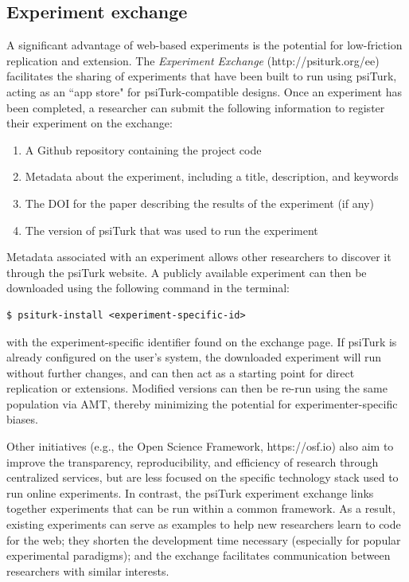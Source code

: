 \documentclass[twocolumn]{svjour3}          %
\begin{document}
\subsection{Experiment exchange}

A significant advantage of web-based experiments is the potential for low-friction replication and extension. 
The \emph{Experiment Exchange} (http://psiturk.org/ee) facilitates the sharing of experiments that have been built to run using psiTurk, acting as an ``app store" for psiTurk-compatible designs.
Once an experiment has been completed, a researcher can submit the following information to register their experiment on the exchange:

\begin{enumerate}
\item A Github repository containing the project code
\item Metadata about the experiment, including a title, description, and keywords
\item The DOI for the paper describing the results of the experiment (if any)
\item The version of psiTurk that was used to run the experiment
\end{enumerate}


Metadata associated with an experiment allows other researchers to discover it through the psiTurk website.
A publicly available experiment can then be downloaded using the following command in the terminal:

\begin{lstlisting}
$ psiturk-install <experiment-specific-id>
\end{lstlisting}

\noindent with the experiment-specific identifier found on the exchange page.
If psiTurk is already configured on the user's system, the downloaded experiment will run without further changes, and can then act as a starting point for direct replication or extensions.
Modified versions can then be re-run using the same population via AMT, thereby minimizing the potential for experimenter-specific biases.

Other initiatives (e.g., the Open Science Framework, https://osf.io) also aim to improve the transparency, reproducibility, and efficiency of research through centralized services, but are less focused on the specific technology stack used to run online experiments.
In contrast, the psiTurk experiment exchange links together experiments that can be run within a common framework.
As a result, existing experiments can serve as examples to help new researchers learn to code for the web; they shorten the development time necessary (especially for popular experimental paradigms); and the exchange facilitates communication between researchers with similar interests.
\end{document}
